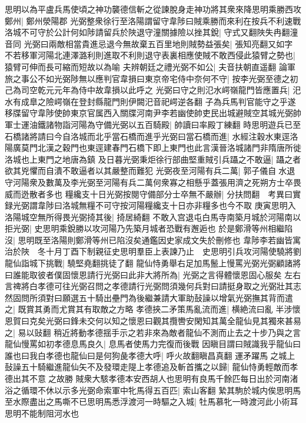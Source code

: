 思明以為平盧兵馬使頃之神功襲德信斬之從諫脫身走神功將其衆來降思明乘勝西攻鄭州|{
	鄭州滎陽郡}
光弼整衆徐行至洛陽謂留守韋陟曰賊乘勝而來利在按兵不利速戰洛城不可守於公計何如陟請留兵於陜退守潼關據險以挫其銳|{
	守式又翻陜失冉翻潼音同}
光弼曰兩敵相當貴進忌退今無故棄五百里地則賊勢益張矣|{
	張知亮翻又如字}
不若移軍河陽北連澤潞利則進取不利則退守表裏相應使賊不敢西侵此猿臂之勢也|{
	猿臂可伸而長可縮而短故以為喻}
夫辨朝廷之禮光弼不如公|{
	夫音扶朝直遥翻}
論軍旅之事公不如光弼陟無以應判官韋損曰東京帝宅侍中奈何不守|{
	按李光弼至德之初己為司空乾元元年為侍中故韋損以此呼之}
光弼曰守之則氾水崿嶺龍門皆應置兵|{
	汜水有成臯之險崿嶺在登封縣龍門則伊闕汜音祀崿逆各翻}
子為兵馬判官能守之乎遂移牒留守韋陟使帥東京官属西入關牒河南尹李若幽使帥吏民出城避賊空其城光弼帥軍士運油鐵諸物詣河陽為守備光弼以五百騎殿|{
	帥讀曰率殿丁練翻}
時思明遊兵已至石橋諸將請曰今自洛城而北乎當石橋而進乎光弼曰當石橋而進|{
	水經注穀水東逕洛陽廣莫門北漢之穀門也東逕建春門石橋下即上東門也此言漢晉洛城諸門非隋唐所徙洛城也上東門之地唐為鎮}
及日暮光弼秉炬徐行部曲堅重賊引兵躡之不敢逼|{
	躡之者欲其兇懼而自潰不敢逼者以其嚴整而難犯}
光弼夜至河陽有兵二萬|{
	郭子儀自水退守河陽衆及數萬及李光弼至河陽有兵二萬何衆寡之相懸乎蓋張用濟之死朔方士卒畏威而迯散者多也}
糧纔支十日光弼按閱守備部分士卒無不嚴辦|{
	分扶問翻　考異曰實録光弼謂韋陟曰洛城無糧不可守按河陽糧纔支十日亦非糧多也今不取}
庚寅思明入洛陽城空無所得畏光弼掎其後|{
	掎居綺翻}
不敢入宫退屯白馬寺南築月城於河陽南以拒光弼|{
	史思明乘銳勝以攻河陽乃先築月城者恐戰有邂逅也}
於是鄭滑等州相繼陷沒|{
	思明既至洛陽則鄭滑等州已陷沒矣通鑑因史家成文失於刪修也}
韋陟李若幽皆寓治於陜　冬十月丁酉下制親征史思明羣臣上表諫乃止　史思明引兵攻河陽使驍將劉龍仙詣城下挑戰|{
	驍堅堯翻挑徒了翻}
龍仙恃勇舉右足加馬鬛上慢罵光弼光弼顧諸將曰誰能取彼者僕固懷恩請行光弼曰此非大將所為|{
	光弼之言得體懷恩固心服矣}
左右言禆將白孝德可往光弼召問之孝德請行光弼問須幾何兵對曰請挺身取之光弼壯其志然固問所須對曰願選五十騎出壘門為後繼兼請大軍助鼔譟以增氣光弼撫其背而遣之|{
	既賞其勇而尤賞其有取敵之方略}
孝德挾二矛策馬亂流而進|{
	横絶流曰亂}
半涉懷恩賀曰克矣光弼曰鋒未交何以知之懷恩曰觀其攬轡安閑知其萬全龍仙見其獨來甚易之|{
	易以䜴翻}
稍近將動孝德揺手示之若非來為敵者龍仙不測而止去之十步乃與之言龍仙慢罵如初孝德息馬良久|{
	息馬者使馬力完復而後戰}
因瞋目謂曰賊識我乎龍仙曰誰也曰我白孝德也龍仙曰是何狗彘孝德大呼|{
	呼火故翻瞋昌真翻}
運矛躍馬之城上鼔譟五十騎繼進龍仙矢不及發環走隄上孝德追及斬首攜之以歸|{
	龍仙恃勇輕敵而孝德出其不意之故勝}
賊衆大駭孝德本安西胡人也思明有良馬千餘匹每日出於河南渚浴之循環不休以示多光弼命索軍中牝馬得五百匹|{
	索山客翻}
縶其駒於城内俟思明馬至水際盡出之馬嘶不已思明馬悉浮渡河一時驅之入城|{
	牡馬慕牝一時渡河此小術耳思明不能制阻河水也}

